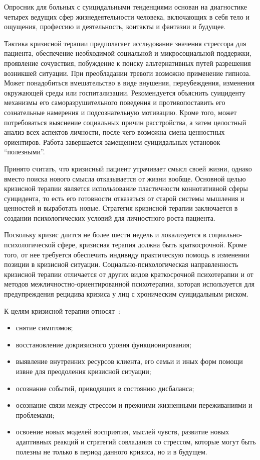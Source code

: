 Опросник для больных с суицидальными тенденциями основан на диагностике четырех ведущих сфер жизнедеятельности человека, включающих в себя тело и ощущения, профессию и деятельность, контакты и фантазии и будущее.~\cite{starsen}

Тактика кризисной терапии предполагает исследование значения стрессора для пациента, обеспечение необходимой социальной и микросоциальной поддержки, проявление сочувствия, побуждение к поиску альтернативных путей разрешения возникшей ситуации. При преобладании тревоги возможно применение гипноза. Может понадобиться вмешательство в виде внушения, переубеждения, изменения окружающей среды или госпитализации. Рекомендуется объяснить суициденту механизмы его саморазрушительного поведения и противопоставить его сознательные намерения и подсознательную мотивацию. Кроме того, может потребоваться выяснение социальных причин расстройства, а затем целостный анализ всех аспектов личности, после чего возможна смена ценностных ориентиров. Работа завершается замещением суицидальных установок ``полезными''.~\cite{starsen}

Принято считать, что кризисный пациент утрачивает смысл своей жизни, однако вместо поиска нового смысла отказывается от жизни вообще. Основной целью кризисной терапии является использование пластичности коннотативной сферы суицидента, то есть его готовности отказаться от старой системы мышления и ценностей и выработать новые. Стратегия кризисной терапии заключается в создании психологических условий для личностного роста пациента.~\cite{starsen}

Поскольку кризис длится не более шести недель и локализуется в социально-психологической сфере, кризисная терапия должна быть краткосрочной. Кроме того, от нее требуется обеспечить индивиду практическую помощь в изменении позиции в кризисной ситуации. Социально-психологическая направленность кризисной терапии отличается от других видов краткосрочной психотерапии и от методов межличностно-ориентированной психотерапии, которая используется для предупреждения рецидива кризиса у лиц с хроническим суицидальным риском.~\cite{starsen}

К целям кризисной терапии относят~\cite{rappo}:

\begin{itemize}
	\item снятие симптомов;
	\item восстановление докризисного уровня функционирования;
	\item выявление внутренних ресурсов клиента, его семьи и иных форм помощи извне для преодоления кризисной ситуации;
	\item осознание событий, приводящих в состоянию дисбаланса;
	\item осознание связи между стрессом и прежними жизненными переживаниями и проблемами;
	\item освоение новых моделей восприятия, мыслей чувств, развитие новых адаптивных реакций и стратегий совладания со стрессом, которые могут быть полезны не только в период данного кризиса, но и в будущем.
\end{itemize}

